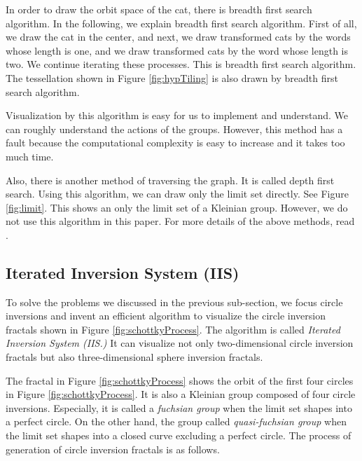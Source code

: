In order to draw the orbit space of the cat, there is breadth first search
algorithm.
In the following, we explain breadth first search algorithm.
First of all, we draw the cat in the center, and
next, we draw transformed cats by the words whose length is one,
and we draw transformed cats by the word whose length is two.
We continue iterating these processes.
This is breadth first search algorithm.
The tessellation shown in Figure \ref{fig:hypTiling} is also drawn by
breadth first search algorithm.

Visualization by this algorithm is easy for us to implement and understand.
We can roughly understand the actions of the groups.
However, this method has a fault because the computational complexity is 
easy to increase and it takes too much time.

Also, there is another method of traversing the graph.
It is called depth first search.
Using this algorithm, we can draw only the limit set directly.
See Figure \ref{fig:limit}. This shows an only the limit set of a Kleinian
group.
However, we do not use this algorithm in this paper.
For more details of the above methods, read \cite{MumfordSeriesWright200204}.

\subsection{Iterated Inversion System (IIS)}

\noindent To solve the problems we discussed in the previous sub-section,
we focus circle inversions and invent an efficient algorithm to
visualize the circle inversion fractals shown in Figure \ref{fig:schottkyProcess}.
The algorithm is called \textit{Iterated Inversion System (IIS.)}
It can visualize not only two-dimensional circle inversion fractals but
also three-dimensional sphere inversion fractals.

The fractal in Figure \ref{fig:schottkyProcess} shows the orbit of the first
four circles in Figure \ref{fig:schottkyProcess}.
It is also a Kleinian group composed of four circle inversions.
Especially, it is called a \textit{fuchsian group} when the limit set
shapes into a perfect circle.
On the other hand, the group called \textit{quasi-fuchsian group}
when the limit set shapes into a closed curve excluding a perfect circle.
The process of generation of circle inversion fractals is
as follows.

